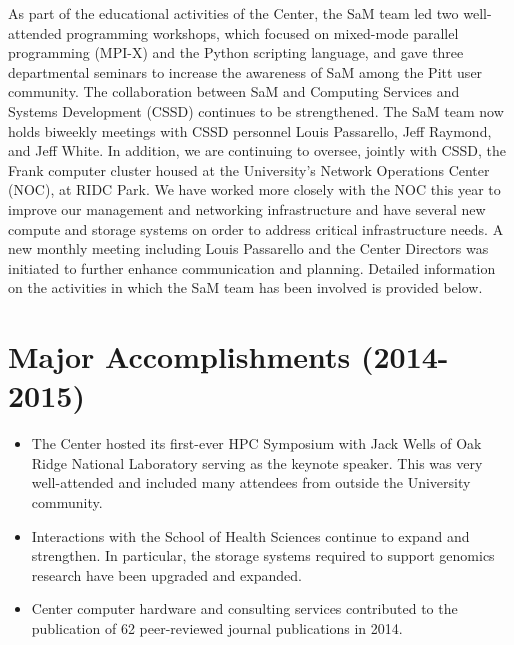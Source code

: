 As part of the educational activities of the Center, the SaM team led two well-attended programming workshops, which focused on mixed-mode parallel programming (MPI-X) and the Python scripting language, and
gave three departmental seminars to increase the awareness of SaM among the
Pitt user community.  The collaboration between SaM and Computing Services and
Systems Development (CSSD) continues to be strengthened. The SaM team now holds
biweekly meetings with CSSD personnel Louis Passarello, Jeff Raymond, and Jeff
White.  In addition, we are continuing to oversee, jointly
with CSSD, the Frank computer cluster housed at the University's Network
Operations Center (NOC), at RIDC Park.  We have worked more closely with the NOC
this year to improve our management and networking infrastructure and have
several new compute and storage systems on order to address critical infrastructure needs.  A new
monthly meeting including Louis Passarello and the Center Directors was
initiated to further enhance communication and planning.  Detailed information
on the activities in which the SaM team has been involved is provided below.


\section{Major Accomplishments (2014-2015)}

\begin{itemize}
    \item The Center hosted its first-ever HPC Symposium with Jack Wells of
          Oak Ridge National Laboratory serving as the keynote speaker.  This
          was very well-attended and included many attendees from outside the
          University community.

    \item Interactions with the School of Health Sciences continue to expand
	  and strengthen.  In particular, the storage systems required to
	  support genomics research have been upgraded and expanded.

    \item Center computer hardware and consulting services contributed to the
	  publication of 62 peer-reviewed journal publications in 2014.

\end{itemize}

